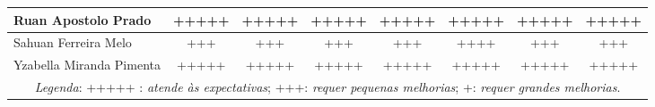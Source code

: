 \begin{landscape}
\begin{table}[htbp]
{\begin{tabular}{|l|c|c|c|c|c|c|c|}
Ruan Apostolo Prado              & +++++ & +++++ & +++++ & +++++ & +++++ & +++++ & +++++  \\ \hline
Sahuan Ferreira Melo             & +++ & +++ & +++ & +++ & ++++ & +++ & +++  \\ \hline
Yzabella Miranda Pimenta         & +++++ & +++++ & +++++ & +++++ & +++++ & +++++ & +++++  \\ \hline
\multicolumn{8}{c}{\textit{Legenda}: +++++ : \textit{atende às expectativas}; +++: \textit{requer pequenas melhorias}; +: \textit{requer grandes melhorias}.}
\end{tabular}
}
\end{table}\end{landscape}